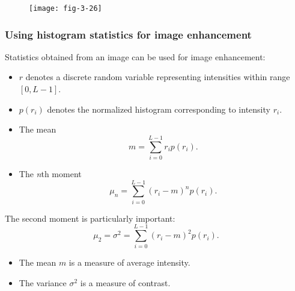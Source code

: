 
\begin{frame}
\begin{figure}
\centering
\texttt{[image: fig-3-26]}
\end{figure}
\end{frame}


\subsubsection{Using histogram statistics for image enhancement}


\begin{frame}
Statistics obtained from an image can be used for image enhancement:
\begin{itemize}
\item $r$ denotes a discrete random variable representing intensities within range $[0,L-1]$.
\item $p(r_{i})$ denotes the normalized histogram corresponding to intensity $r_{i}$.
\item The mean
\begin{equation}
m = \sum_{i=0}^{L-1}r_{i}p(r_{i}).
\end{equation}
\item The \textit{n}th moment
\begin{equation}
\mu_{n} = \sum_{i=0}^{L-1} \left ( r_{i} - m \right )^{n} p(r_{i}).
\end{equation}
\end{itemize}
\end{frame}


\begin{frame}
The second moment is particularly important:
\begin{equation}
\mu_{2} = \sigma^{2} = \sum_{i=0}^{L-1} \left ( r_{i} - m \right )^{2} p(r_{i}).
\end{equation}
\begin{itemize}
\item The mean $m$ is a measure of average intensity.
\item The variance $\sigma^{2}$ is a measure of contrast.
\end{itemize}
\end{frame}

